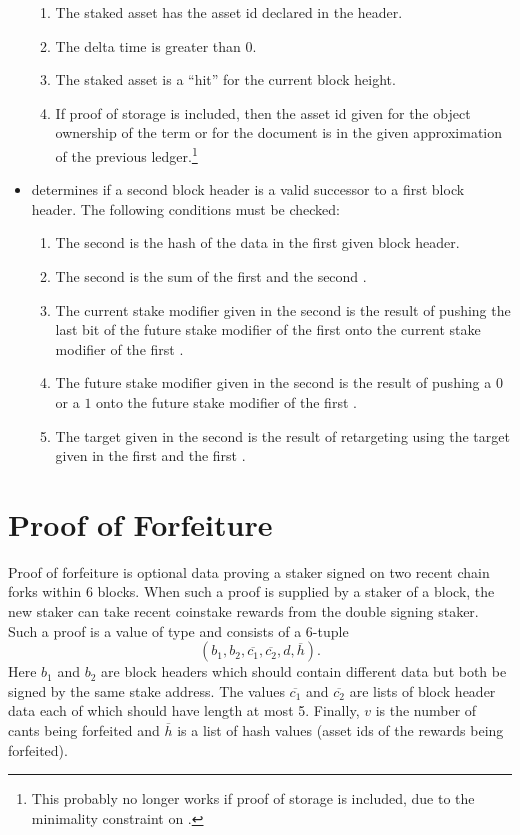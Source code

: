 \begin{itemize}
\begin{enumerate}
\item The staked asset has the asset id declared in the header.
\item The delta time is greater than $0$.
\item The staked asset is a ``hit'' for the current block height.
\item If proof of storage is included, then the asset id given for the
object ownership of the term or
for the document
is in the given approximation of the previous ledger.\footnote{This probably no longer works if proof of storage is included, due to the minimality constraint on {}.}
\end{enumerate}
\item {} determines if a second block header is a valid successor to a first block header.
The following conditions must be checked:
\begin{enumerate}
\item The second {} is the hash of the data in the first given block header.
\item The second {} is the sum of the first {} and the second {}.
\item The current stake modifier given in the second {}
 is the result of pushing the last bit of the future stake modifier of the first {}
 onto the current stake modifier of the first {}.
\item The future stake modifier given in the second {}
      is the result of pushing a $0$ or a $1$ onto the future stake modifier of the first {}.
\item The target given in the second {} is the result of retargeting using
      the target given in the first {}
      and the first {}.
\end{enumerate}
\end{itemize}

\section{Proof of Forfeiture}

Proof of forfeiture is
optional data proving a staker signed on two recent chain forks within 6 blocks.
When such a proof is supplied by a staker of a block, the new staker can
take recent coinstake rewards from the double signing staker.
Such a proof is a value of type {}
and consists of a 6-tuple
$$(b_1,b_2,\overline{c_1},\overline{c_2},d,\overline{h}).$$
Here $b_1$ and $b_2$ are block headers which should contain different data but both be signed by the
same stake address.
The values $\overline{c_1}$ and $\overline{c_2}$ are lists of block header data
each of which should have length at most 5.
Finally, $v$ is the number of cants being forfeited
and $\overline{h}$ is a list of hash values (asset ids of the rewards being forfeited).

